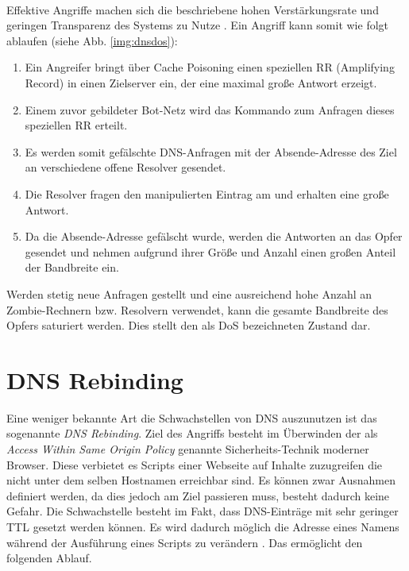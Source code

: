 \paragraph{}
Effektive Angriffe machen sich die beschriebene hohen Verstärkungsrate und geringen Transparenz des Systems zu Nutze \cite{Kambourakis2008}. Ein Angriff kann somit wie folgt ablaufen (siehe Abb. \ref{img:dnsdos}):
\begin{enumerate}[topsep=0pt,itemsep=-1ex,partopsep=1ex,parsep=1ex]
    \item Ein Angreifer bringt über Cache Poisoning einen speziellen RR (Amplifying Record) in einen Zielserver ein, der eine maximal große Antwort erzeigt.
    \item Einem zuvor gebildeter Bot-Netz wird das Kommando zum Anfragen dieses speziellen RR erteilt. 
    \item Es werden somit gefälschte DNS-Anfragen mit der Absende-Adresse des Ziel an verschiedene offene Resolver gesendet.
    \item Die Resolver fragen den manipulierten Eintrag am und erhalten eine große Antwort.
    \item Da die Absende-Adresse gefälscht wurde, werden die Antworten an das Opfer gesendet und nehmen aufgrund ihrer Größe und Anzahl einen großen Anteil der Bandbreite ein. 
\end{enumerate}
Werden stetig neue Anfragen gestellt und eine ausreichend hohe Anzahl an Zombie-Rechnern bzw. Resolvern verwendet, kann die gesamte Bandbreite des Opfers saturiert werden. Dies stellt den als \ac{DoS} bezeichneten Zustand dar.

\section{DNS Rebinding}
\label{sec:attack-dnsrebind}
Eine weniger bekannte Art die Schwachstellen von DNS auszunutzen ist das sogenannte \textit{DNS Rebinding}. Ziel des Angriffs besteht im Überwinden der als \textit{Access Within Same Origin Policy} genannte Sicherheits-Technik moderner Browser. Diese verbietet es Scripts einer Webseite auf Inhalte zuzugreifen die nicht unter dem selben Hostnamen erreichbar sind. Es können zwar Ausnahmen definiert werden, da dies jedoch am Ziel passieren muss, besteht dadurch keine Gefahr. Die Schwachstelle besteht im Fakt, dass DNS-Einträge mit sehr geringer TTL gesetzt werden können. Es wird dadurch möglich die Adresse eines Namens während der Ausführung eines Scripts zu verändern \cite{Jackson2009}. Das ermöglicht den folgenden Ablauf.

